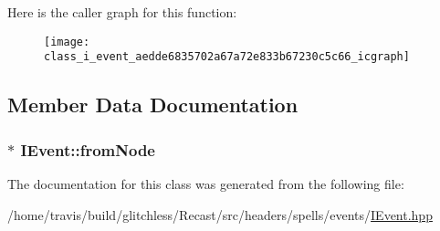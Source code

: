 Here is the caller graph for this function\-:
\nopagebreak
\begin{figure}[H]
\begin{center}
\leavevmode
\texttt{[image: class\_i\_event\_aedde6835702a67a72e833b67230c5c66\_icgraph]}
\end{center}
\end{figure}




\subsection{Member Data Documentation}
\hypertarget{class_i_event_a3bc076098af89f7da2364efeae372876}{
\subsubsection[{from\-Node}]{$\ast$ I\-Event\-::from\-Node\hspace{0.3cm}{\ttfamily [protected]}}}\label{class_i_event_a3bc076098af89f7da2364efeae372876}


The documentation for this class was generated from the following file\-:\begin{DoxyCompactItemize}
\item 
/home/travis/build/glitchless/\-Recast/src/headers/spells/events/\hyperlink{_i_event_8hpp}{I\-Event.\-hpp}\end{DoxyCompactItemize}
